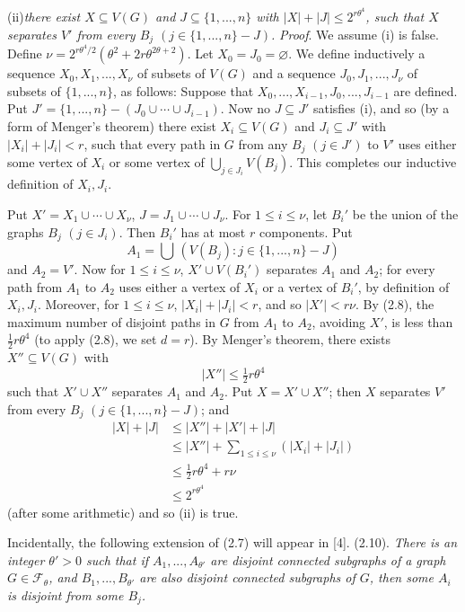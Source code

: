\hspace*{12pt}(ii)\enspace\textit{there exist $X\subseteq V(G)$ and $J\subseteq\{1,..., n\}$ with $|X|+|J|\le 2^{r\theta^4}$, such
that $X$ separates $V'$ from every $B_j$ $(j\in\{1,..., n\}-J)$.}
\stmt
\textit{Proof}. We assume (i) is false. Define $\nu=2^{r\theta^4/2}(\theta^2+2r\theta^{2\theta+2})$. Let
$X_0=J_0=\varnothing$. We define inductively a sequence $X_0, X_1,..., X_\nu$ of subsets of
$V(G)$ and a sequence $J_0, J_1,..., J_\nu$ of subsets of $\{1,..., n\}$, as follows: Suppose
that $X_0,..., X_{i-1}, J_0,..., J_{i-1}$ are defined. Put $J'=\{1,..., n\}-(J_0\cup\cdots\cup J_{i-1})$.
Now no $J\subseteq J'$ satisfies (i), and so (by a form of Menger's theorem) there
exist $X_i\subseteq V(G)$ and $J_i\subseteq J'$ with $|X_i|+|J_i|<r$, such that every path in $G$
from any $B_j$ $(j\in J')$ to $V'$ uses either some vertex of $X_i$ or some vertex of
$\bigcup_{j\in J_i}V(B_j)$. This completes our inductive definition of $X_i, J_i$.

Put $X'=X_1\cup\cdots\cup X_\nu$, $J=J_1\cup\cdots\cup J_\nu$. For $1\le i\le\nu$, let $B_i'$ be the
union of the graphs $B_j$ $(j\in J_i)$. Then $B_i'$ has at most $r$ components. Put
\begin{equation*}
A_1=\bigcup\,(V(B_j)\colon j\in\{1,..., n\}-J)
\end{equation*}
and $A_2=V'$. Now for $1\le i\le\nu$, $X'\cup V(B_i')$ separates $A_1$ and $A_2$; for every
path from $A_1$ to $A_2$ uses either a vertex of $X_i$ or a vertex of $B_i'$, by definition
of $X_i, J_i$. Moreover, for $1\le i\le\nu$, $|X_i|+|J_i|<r$, and so $|X'|<r\nu$. By (2.8),
the maximum number of disjoint paths in $G$ from $A_1$ to $A_2$, avoiding $X'$, is
less than $\frac12 r\theta^4$ (to apply (2.8), we set $d=r$). By Menger's theorem, there
exists $X''\subseteq V(G)$ with
\begin{equation*}
|X''|\le\tfrac12 r\theta^4
\end{equation*}
such that $X'\cup X''$ separates $A_1$ and $A_2$. Put $X=X'\cup X''$; then $X$ separates
$V'$ from every $B_j$ $(j\in\{1,..., n\}-J)$; and
\begin{align*}
|X|+|J|&\le|X''|+|X'|+|J|\\
&\le|X''|+\sum_{1\le i\le\nu}(|X_i|+|J_i|)\\
&\le\tfrac12 r\theta^4+r\nu\\
&\le 2^{r\theta^4}
\end{align*}
(after some arithmetic) and so (ii) is true.

Incidentally, the following extension of (2.7) will appear in [4].
\stmt
(2.10). \textit{There is an integer $\theta'>0$ such that if $A_1,..., A_{\theta'}$ are disjoint
connected subgraphs of a graph $G\in\mathscr{F}_\theta$, and $B_1,..., B_{\theta'}$ are also disjoint
connected subgraphs of $G$, then some $A_i$ is disjoint from some $B_j$.}
